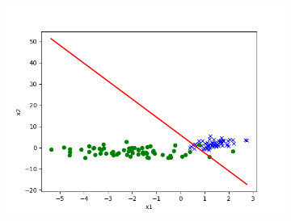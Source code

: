 \begin{answer}
\begin{figure}[h]
\begin{subfigure}[b]{0.5\linewidth}
        \includegraphics[width=\linewidth]{tex/p02e_pred.txt.png}
    \end{subfigure}
\end{figure}
\end{answer}

